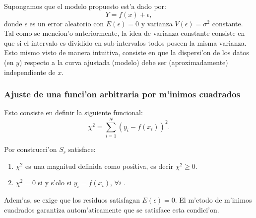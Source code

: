 \documentclass[a4paper]{report}
\begin{document}
Supongamos que el modelo propuesto est'a dado por:
\begin{equation}
Y = f(x)+\epsilon,
\end{equation}
donde $\epsilon$  es un error aleatorio con $E(\epsilon)=0$ y  varianza $V(\epsilon)=\sigma^{2}$ constante. Tal como se mencion'o anteriormente, la idea de varianza constante consiste en que si el intervalo es dividido en sub-intervalos todos poseen la misma varianza. Esto mismo visto de manera intuitiva, consiste en que la dispersi'on de los datos (en $y$) respecto a la curva ajustada (modelo) debe ser (aproximadamente) independiente de $x$.

\subsubsection{Ajuste de una funci'on arbitraria por m'inimos cuadrados}
Esto consiste en definir la siguiente funcional: 
\begin{equation}
\chi^2=\sum_{i=1}^N\left(y_i-f(x_i)\right)^2.
\end{equation}

Por construcci'on $S_{r}$ satisface:
\begin{enumerate}
\item $\chi^2$ es una magnitud definida como positiva, es decir $\chi^2\geq 0$.
\item $\chi^2 = 0$ si y s'olo si $y_i = f(x_i)$, $\forall i$ .
\end{enumerate}

Adem'as, se exige que los residuos satisfagan $E(\epsilon)= 0$. El m'etodo de m'inimos cuadrados garantiza autom'aticamente que se satisface esta condici'on.
\end{document}
